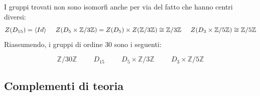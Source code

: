\documentclass[11pt]{article}
\theoremstyle{style}
\newenvironment{boxenv}[1][]{
    \begin{eqbox}[#1]
    }{
   \end{eqbox}
}
\numberwithin{equation}{subsection}
\begin{document}
I gruppi trovati non sono isomorfi anche per via del fatto che hanno centri diversi:
\[
Z(D_{15}) = \langle Id \rangle \hspace{.5cm}Z(D_5\times \mathbb{Z}/3\mathbb{Z}) = Z(D_5) \times Z(\mathbb{Z}/3\mathbb{Z}) \cong \mathbb{Z}/3\mathbb{Z} \hspace{.5cm}Z(D_3\times \mathbb{Z}/5\mathbb{Z}) \cong \mathbb{Z}/5\mathbb{Z}
\] 
Riassumendo, i gruppi di ordine $30$ sono i seguenti:
\begin{boxenv}[]
\[
\mathbb{Z}/30\mathbb{Z} \hspace{1cm}D_{15}\hspace{1cm}D_5 \times \mathbb{Z}/3\mathbb{Z} \hspace{1cm}D_3 \times \mathbb{Z}/5\mathbb{Z}
\] 
\end{boxenv}

\newpage
\subsection{Complementi di teoria}
\end{document}
